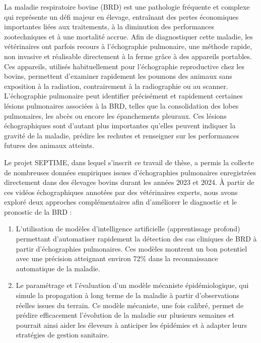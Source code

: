 La maladie respiratoire bovine (BRD) est une pathologie fréquente et complexe qui représente un défi majeur en élevage, entraînant des pertes économiques importantes liées aux traitements, à la diminution des performances zootechniques et à une mortalité accrue. Afin de diagnostiquer cette maladie, les vétérinaires ont parfois recours à l’échographie pulmonaire, une méthode rapide, non invasive et réalisable directement à la ferme grâce à des appareils portables. Ces appareils, utilisés habituellement pour l'échographie reproductive chez les bovins, permettent d’examiner rapidement les poumons des animaux sans exposition à la radiation, contrairement à la radiographie ou au scanner. L’échographie pulmonaire peut identifier précisément et rapidement certaines lésions pulmonaires associées à la BRD, telles que la consolidation des lobes pulmonaires, les abcès ou encore les épanchements pleuraux. Ces lésions échographiques sont d’autant plus importantes qu’elles peuvent indiquer la gravité de la maladie, prédire les rechutes et renseigner sur les performances futures des animaux atteints.

Le projet SEPTIME, dans lequel s’inscrit ce travail de thèse, a permis la collecte de nombreuses données empiriques issues d’échographies pulmonaires enregistrées directement dans des élevages bovins durant les années 2023 et 2024. À partir de ces vidéos échographiques annotées par des vétérinaires experts, nous avons exploré deux approches complémentaires afin d’améliorer le diagnostic et le pronostic de la BRD :

\begin{enumerate} 
    \item L’utilisation de modèles d’intelligence artificielle (apprentissage profond) permettant d’automatiser rapidement la détection des cas cliniques de BRD à partir d’échographies pulmonaires. Ces modèles montrent un bon potentiel avec une précision atteignant environ 72\% dans la reconnaissance automatique de la maladie.

    \item Le paramétrage et l’évaluation d’un modèle mécaniste épidémiologique, qui simule la propagation à long terme de la maladie à partir d'observations réelles issues du terrain. Ce modèle mécaniste, une fois calibré, permet de prédire efficacement l’évolution de la maladie sur plusieurs semaines et pourrait ainsi aider les éleveurs à anticiper les épidémies et à adapter leurs stratégies de gestion sanitaire.

\end{enumerate}

